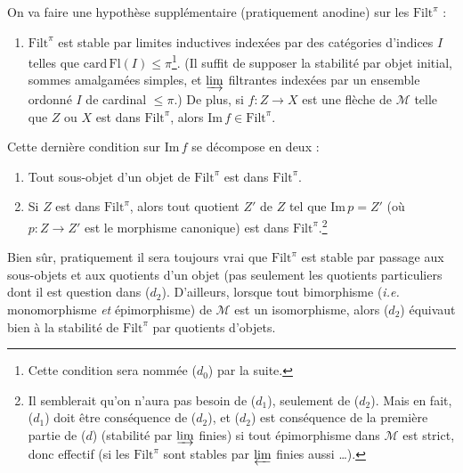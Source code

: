 \documentclass[11pt]{article}
\newcommand{\printedpage}[1]{\marginpar{\footnotesize p.~#1}}
\newcommand{\msp}[1]{\marginpar{\footnotesize [#1]}}
\newcommand{\cM}{\mathcal{M}}
\newcommand{\Filt}{\mathrm{Filt}}
\newcommand{\Img}{\mathrm{Im}\,}
\newcommand{\Fl}{\mathrm{Fl}}
\newcommand{\card}{\mathrm{card}\,}
\begin{document}
On va faire une hypothèse supplémentaire (pratiquement anodine) sur les $\Filt^{\pi}$ :

\begin{enumerate}[nosep]
\item[\textit{d})] $\Filt^{\pi}$ est stable par limites inductives indexées par des catégories d'indices $I$ telles que $\card \Fl(I) \leq \pi$\footnote[16]{Cette condition sera nommée ($d_0$) par la suite.}. (Il suffit de supposer la stabilité par objet initial, sommes amalgamées simples, et $\varinjlim$ filtrantes indexées par un ensemble ordonné $I$ de cardinal $\leq \pi$.) De plus, si $f : Z \longrightarrow X$ est une flèche de $\cM$ telle que $Z$ ou $X$ est dans $\Filt^{\pi}$, alors $\Img f \in \Filt^{\pi}$.
\end{enumerate}

Cette dernière condition sur $\Img f$ se décompose en deux :
\msp{page 46}

\begin{enumerate}[nosep]
\item[$d_1$)] Tout sous-objet d'un objet de $\Filt^{\pi}$ est dans $\Filt^{\pi}$.
\item[$d_2$)] Si $Z$ est dans $\Filt^{\pi}$, alors tout quotient $Z'$ de $Z$ tel que $\Img p = Z'$ (où $p : Z \longrightarrow Z'$ est le morphisme canonique) est dans $\Filt^{\pi}$.\footnote[17]{Il semblerait qu'on n'aura pas besoin de ($d_1$), seulement de ($d_2$). Mais en fait, ($d_1$) doit être conséquence de ($d_2$), et ($d_2$) est conséquence de la première partie de ($d$) (stabilité par $\varinjlim$ finies) si tout épimorphisme dans $\cM$ est strict, donc effectif (si les $\Filt^{\pi}$ sont stables par $\varprojlim$ finies aussi \ldots).}
\end{enumerate}

\printedpage{30}

Bien sûr, pratiquement il sera toujours vrai que $\Filt^{\pi}$ est stable par passage aux sous-objets et aux quotients d'un objet (pas seulement les quotients particuliers dont il est question dans ($d_2$). %
D'ailleurs, lorsque tout bimorphisme (\textit{i.e.} monomorphisme \textit{et} épimorphisme) de $\cM$ est un isomorphisme, alors ($d_2$) équivaut bien à la stabilité de $\Filt^{\pi}$ par quotients d'objets.
\end{document}
